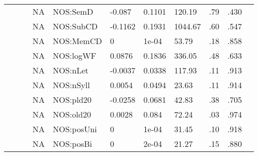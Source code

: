 \begin{table}[ht]
\begin{tabular}{lllllllllll}
   &  &  & NA & NOS:SemD & -0.087 & 0.1101 & 120.19 & .79 & .430 &   \\ 
   &  &  & NA & NOS:SubCD & -0.1162 & 0.1931 & 1044.67 & .60 & .547 &   \\ 
   &  &  & NA & NOS:MemCD & 0 & 1e-04 & 53.79 & .18 & .858 &   \\ 
   &  &  & NA & NOS:logWF & 0.0876 & 0.1836 & 336.05 & .48 & .633 &   \\ 
   &  &  & NA & NOS:nLet & -0.0037 & 0.0338 & 117.93 & .11 & .913 &   \\ 
   &  &  & NA & NOS:nSyll & 0.0054 & 0.0494 & 23.63 & .11 & .914 &   \\ 
   &  &  & NA & NOS:pld20 & -0.0258 & 0.0681 & 42.83 & .38 & .705 &   \\ 
   &  &  & NA & NOS:old20 & 0.0028 & 0.084 & 72.24 & .03 & .974 &   \\ 
   &  &  & NA & NOS:posUni & 0 & 1e-04 & 31.45 & .10 & .918 &   \\ 
   &  &  & NA & NOS:posBi & 0 & 2e-04 & 21.27 & .15 & .880 &   \\ 
   \hline
\end{tabular}
\endgroup
\end{table}
